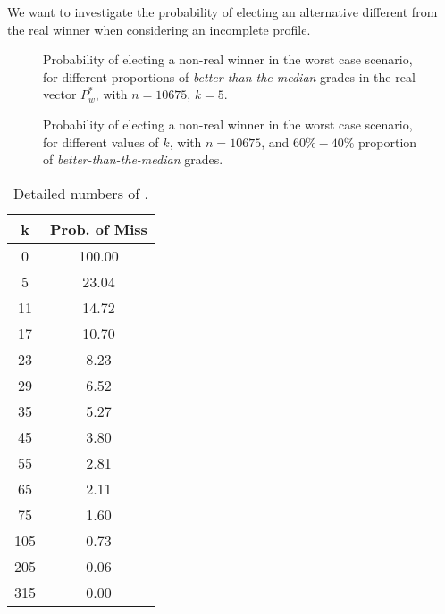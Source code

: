 \documentclass[version=3.21, pagesize, twoside=off, bibliography=totoc, DIV=calc, fontsize=12pt, a4paper]{scrartcl}
\begin{document}
We want to investigate the probability of electing an alternative different from the real winner when considering an incomplete profile.

\begin{figure}
	\centering
	\caption{Probability of electing a non-real winner in the worst case scenario, for different proportions of \emph{better-than-the-median} grades in the real vector $P_w^*$, with $n=10675$, $k=5$.}
	\label{fig:gradesDistribution}
\end{figure}

\begin{figure}
	\centering
	\caption{Probability of electing a non-real winner in the worst case scenario, for different values of $k$, with $n=10675$, and $60\%-40\%$ proportion of \emph{better-than-the-median} grades.}
	\label{fig:differentK}
\end{figure}

\begin{table}
	\centering
	\begin{tabular}{S[table-figures-integer=3, table-figures-decimal=0]S[table-figures-integer=3, table-figures-decimal=2]}
			\toprule
			{k} & {Prob. of Miss} \\
				&	100.00	\\
			5	&	23.04	\\
			11	&	14.72	\\
			17	&	10.70	\\
			23	&	8.23	\\
			29	&	6.52	\\
			35	&	5.27	\\
			45	&	3.80	\\
			55	&	2.81	\\
			65	&	2.11	\\
			75	&	1.60	\\
			105	&	0.73	\\
			205	&	0.06	\\
			315	&	0.00	\\
			\bottomrule
		\end{tabular}
	\caption{Detailed numbers of .}
	\label{tab:differentK}
\end{table}
\end{document}

